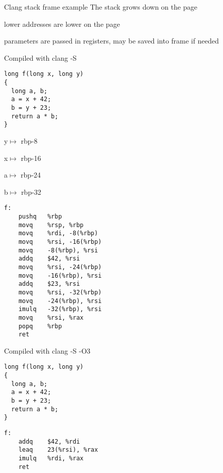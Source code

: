 \documentclass[landscape]{beamer}
\begin{document}
\begin{frame}[fragile]{Clang stack frame example}
The stack grows down on the page

lower addresses are lower on the page

parameters are passed in registers, may be saved into frame if needed

  
\end{frame} 


\begin{frame}[fragile]{Compiled with clang -S}
\begin{minipage}{.5\textwidth}
\begin{verbatim}
long f(long x, long y)
{
  long a, b;
  a = x + 42;
  b = y + 23;
  return a * b;
}
\end{verbatim}

y$\mapsto$ rbp-8

x$\mapsto$ rbp-16

a$\mapsto$ rbp-24

b$\mapsto$ rbp-32

\end{minipage}
%
\begin{minipage}{.4\textwidth}
\begin{verbatim}
f:
	pushq	%rbp
	movq	%rsp, %rbp
	movq	%rdi, -8(%rbp)
	movq	%rsi, -16(%rbp)
	movq	-8(%rbp), %rsi
	addq	$42, %rsi
	movq	%rsi, -24(%rbp)
	movq	-16(%rbp), %rsi
	addq	$23, %rsi
	movq	%rsi, -32(%rbp)
	movq	-24(%rbp), %rsi
	imulq	-32(%rbp), %rsi
	movq	%rsi, %rax
	popq	%rbp
	ret
\end{verbatim}
\end{minipage}
\end{frame}


\begin{frame}[fragile]{Compiled with clang -S -O3}
\begin{minipage}{.5\textwidth}
\begin{verbatim}
long f(long x, long y)
{
  long a, b;
  a = x + 42;
  b = y + 23;
  return a * b;
}
\end{verbatim}
\end{minipage}
%
\begin{minipage}{.4\textwidth}
\begin{verbatim}
f:                                      
	addq	$42, %rdi
	leaq	23(%rsi), %rax
	imulq	%rdi, %rax
	ret
\end{verbatim}
\end{minipage}
\end{frame}
\end{document}
